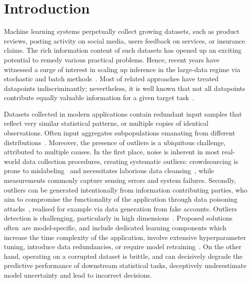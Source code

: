 \section{Introduction}
\label{sec:introduction}

Machine learning systems perpetually collect growing datasets, such as product reviews, posting activity on social media, users feedback on services, or insurance claims. The rich information content of such datasets has opened up an exciting potential to remedy various practical problems. Hence, recent years have witnessed a surge of interest in scaling up inference in the large-data regime via stochastic and batch methods~\cite{angelino16, hoffman13, welling11}. Most of related approaches have treated datapoints indiscriminantly; nevertheless, it is well known that not all datapoints contribute equally valuable information for a given target task~\cite{ghorbani19}. 

Datasets collected in modern applications contain redundant input samples that reflect very similar statistical patterns, or multiple copies of identical observations. Often input aggregates subpopulations emanating from different distributions~\cite{zheng08, zhuang15}. Moreover, the presence of outliers is a ubiquitous challenge, attributed to multiple causes. In the first place, noise is inherent in most real-world data collection procedures, creating systematic outliers: crowdsourcing is prone to mislabeling~\cite{frenay13} and necessitates laborious data cleansing~\cite{lewis04, paschou10}, while measurements commonly capture sensing errors and system failures. Secondly, outliers can be generated intentionally from information contributing parties, who aim to compromise the functionality of the application through data poisoning attacks~\cite{barreno10, biggio12, li16, koh17, steinhardt17, ghorbani19}, realised for example via data generation from fake accounts. Outliers detection is  challenging, particularly in high dimensions~\cite{diakonikolas19, dickens20}. Proposed solutions \mbox{often are} model-specific, and include dedicated learning components which increase the time complexity of the application, involve extensive hyperparameter tuning, introduce data redundancies, or require model retraining~\cite{sheng08, whitehill09, raykar10, karger11, liu12, zhang16}. On the other hand, operating on a corrupted dataset is brittle, and can decisively degrade the predictive performance of downstream statistical tasks, deceptively underestimate model uncertainty and lead to incorrect decisions. 

